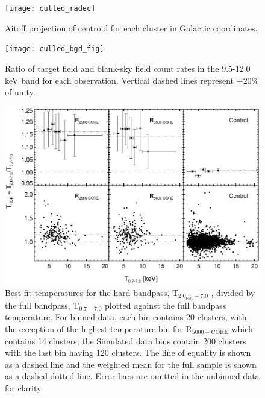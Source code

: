 \documentclass{emulateapj}
\newcommand{\hard}{T$_{2.0_{\text{rest}}-7.0}$ }
\newcommand{\full}{T$_{0.7-7.0}$ }
\begin{document}
\clearpage
\begin{figure}[htp]
\begin{center}
\texttt{[image: culled\_radec]}
\caption{\small Aitoff projection of centroid for each cluster in
Galactic coordinates.}
\label{fig:radec}
\end{center}
\end{figure}

\clearpage
\begin{figure}[htp]
\begin{center}
\texttt{[image: culled\_bgd\_fig]}
\caption{\small Ratio of target field and blank-sky field
count rates in the 9.5-12.0 keV band for each observation. Vertical
dashed lines represent $\pm 20\%$ of unity.}
\label{fig:bgd}
\end{center}
\end{figure}

\clearpage
\begin{figure}[htp]
\begin{center}
\includegraphics[scale=1.0]{ftxcount}
\caption{\small Best-fit temperatures for the hard bandpass,
\hard, divided by the full bandpass, \full plotted
against the full bandpass temperature. For binned data, each bin
contains 20 clusters, with the exception of the highest temperature
bin for R$_{5000-\text{CORE}}$ which contains 14 clusters; the
Simulated data bins contain 200 clusters with the last bin having 120
clusters. The line of equality is shown as a dashed line and the weighted
mean for the full sample is shown as a dashed-dotted line. Error
bars are omitted in the unbinned data for clarity.}
\label{fig:ftx}
\end{center}
\end{figure}
\end{document}
